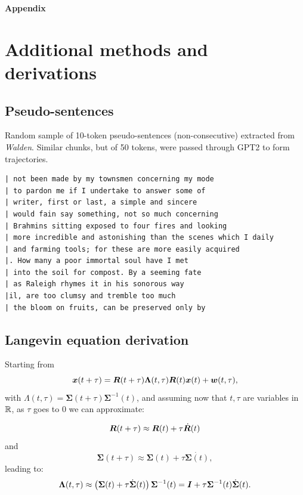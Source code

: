 \documentclass{article} %
\begin{document}
\fi




\clearpage
\vspace{1cm}
\appendix
\textbf{\LARGE Appendix}

\section{Additional methods and derivations}

\subsection{Pseudo-sentences}
\label{app:pseudosentences}
Random sample of 10-token pseudo-sentences (non-consecutive) extracted from \textit{Walden}.
Similar chunks, but of 50 tokens, were passed through GPT2 to form trajectories.
\begin{verbatim}
| not been made by my townsmen concerning my mode
| to pardon me if I undertake to answer some of
| writer, first or last, a simple and sincere
| would fain say something, not so much concerning
| Brahmins sitting exposed to four fires and looking
| more incredible and astonishing than the scenes which I daily
| and farming tools; for these are more easily acquired
|. How many a poor immortal soul have I met
| into the soil for compost. By a seeming fate
| as Raleigh rhymes it in his sonorous way
|il, are too clumsy and tremble too much
| the bloom on fruits, can be preserved only by
\end{verbatim}

\subsection{Langevin equation derivation}
\label{app:lengevin-derivation}
Starting from
\begin{equation*}
   {\bm{x}}(t+\tau) = {\bm{R}}(t+\tau) \mathbf{\Lambda}(t, \tau) {\bm{R}}(t) {\bm{x}}(t) + {\bm{w}}(t, \tau),
\end{equation*}
with $\Lambda(t,\tau) = \mathbf{\Sigma}(t+\tau) \mathbf{\Sigma}^{-1}(t)$, and assuming now that $t, \tau$ are variables in $\mathbb{R}$, as $\tau$ goes to 0 we can approximate:

\begin{equation*}
{\bm{R}}(t+\tau) \approx {\bm{R}}(t) + \tau \dot{{\bm{R}}}(t)    
\end{equation*}
and
\begin{equation*}
    \mathbf{\Sigma}(t + \tau) \approx \mathbf{\Sigma}(t) + \tau \dot{\mathbf{\Sigma}(t)},
\end{equation*}
leading to:
\begin{equation*}
    \mathbf{\Lambda}(t, \tau) \approx \left( \mathbf{\Sigma}(t) + \tau \dot{\mathbf{\Sigma}}(t) \right) \mathbf{\Sigma}^{-1}(t) = {\bm{I}} + \tau \mathbf{\Sigma}^{-1}(t) \dot{\mathbf{\Sigma}}(t).
\end{equation*}
\end{document}
